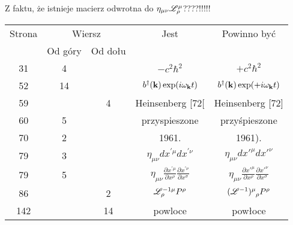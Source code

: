 \documentclass[a4paper,11pt]{article}
\begin{document}
\vspace{0em}



\vspace{0em}


\noindent
{} Z faktu, że istnieje macierz odwrotna do
$\eta_{ \mu \nu } \mathcal{L}^{ \mu }_{ \rho }$????!!!!!







\begin{center}

  \begin{tabular}{|c|c|c|c|c|}
    \hline
    Strona & \multicolumn{2}{c|}{Wiersz} & Jest
                              & Powinno być \\ \cline{2-3}
    & Od góry & Od dołu & & \\
    \hline
    31 & 4 & & $-c^{ 2 } \hbar^{ 2 }$ & $+c^{ 2 } \hbar^{ 2 }$ \\
    52 & 14 & & $b^{ \dagger }( \mathbf{k} ) \exp( i \omega_{ \mathbf{k} } t )$
           & $b^{ \dagger }( \mathbf{k} ) \exp( +i \omega_{ \mathbf{k} } t )$ \\
    59 & & 4 & Heinsenberg [72[ & Heinsenberg [72] \\ %
    60 & 5 & & przyspieszone & przyśpieszone \\
    70 & 2 & & 1961. & 1961). \\
    79 & 3 & & $\eta_{ \mu \nu } dx^{ ' \mu } dx^{ ' \nu }$
           & $\eta_{ \mu \nu } dx'^{ \mu } dx'^{ \nu }$ \\
    79 & 5 & & $\eta_{ \mu \nu } \frac{ \partial x^{ ' \mu } }{ \partial x^{ \rho } }
               \frac{ \partial x^{ ' \nu } }{ \partial x^{ \sigma } }$
           & $\eta_{ \mu \nu } \frac{ \partial x'^{ \mu } }{ \partial x^{ \rho } }
             \frac{ \partial x'^{ \nu } }{ \partial x^{ \sigma } }$ \\
    86 & & 2 & $\mathcal{L}_{ \rho }^{ -1 \mu } P^{ \rho }$
           & $\tensor[]{ ( \Lcal^{ -1 } ) }{ ^{ \mu }_{ \rho } } P^{ \rho }$ \\
    142 & & 14 & powloce & powłoce \\
    \hline
  \end{tabular}







\end{center}
\end{document}
